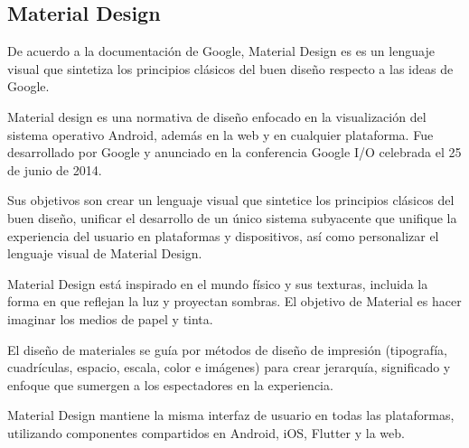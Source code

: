 \subsection*{Material Design}
De acuerdo a la documentación de Google\cite{noauthor_introduction_nodate}, Material Design es es un lenguaje visual que sintetiza los principios clásicos del buen diseño respecto a las ideas de Google.

Material design es una normativa de diseño enfocado en la visualización del sistema operativo Android, además en la web y en cualquier plataforma. Fue desarrollado por Google y anunciado en la conferencia Google I/O celebrada el 25 de junio de 2014. 


Sus objetivos son crear un lenguaje visual que sintetice los principios clásicos del buen diseño, unificar el desarrollo de un único sistema subyacente que unifique la experiencia del usuario en plataformas y dispositivos, así como personalizar el lenguaje visual de Material Design.


Material Design está inspirado en el mundo físico y sus texturas, incluida la forma en que reflejan la luz y proyectan sombras. El objetivo de Material es hacer imaginar los medios de papel y tinta.


El diseño de materiales se guía por métodos de diseño de impresión (tipografía, cuadrículas, espacio, escala, color e imágenes) para crear jerarquía, significado y enfoque que sumergen a los espectadores en la experiencia.


Material Design mantiene la misma interfaz de usuario en todas las plataformas, utilizando componentes compartidos en Android, iOS, Flutter y la web.
